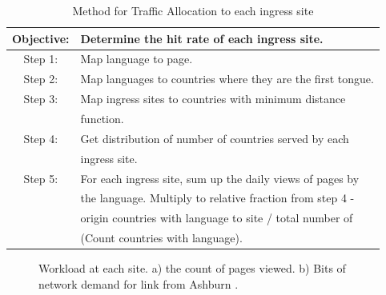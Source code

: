 \documentclass[conference]{IEEEtran}
\begin{document}
\begin{table}[htbp]
\caption{Method for Traffic Allocation to each ingress site}
\begin{center}
\begin{tabular}{cl}
Objective: & Determine the hit rate of each ingress site.                 \\
\hline 
Step 1:    & Map language to page.                                        \\
Step 2:    & Map languages to countries where they are the first tongue.  \\
Step 3:    & Map ingress sites to countries with minimum distance         \\
           & function.                                                    \\
Step 4:    & Get distribution of  number of countries served by each      \\
           & ingress site.                                                \\
Step 5:    & For each ingress site, sum up the daily views of pages by    \\
           & the language. Multiply to relative fraction from step 4 -    \\
           & origin countries  with language to site / total number of    \\
           & (Count countries with language).                             \\  
         

\end{tabular}
\label{lang2bits}
\end{center}
\end{table}

\begin{figure}[!tbh]
  \caption{Workload at each site. a) the count of pages viewed. b) Bits of network demand for link from Ashburn .}
\end{figure}
\end{document}

